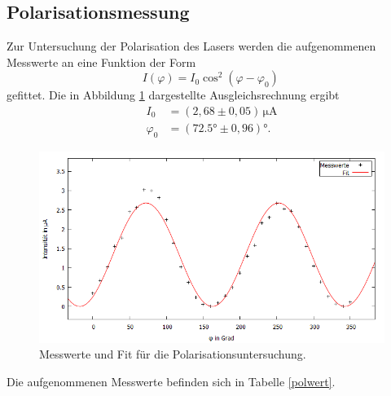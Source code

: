 \subsection{Polarisationsmessung}
Zur Untersuchung der Polarisation des Lasers werden die aufgenommenen Messwerte an eine Funktion der Form
\begin{equation}
   I(\varphi) = I_0 \cos^2\!\left(\varphi-\varphi_0\right)\,
\end{equation}
gefittet. Die in Abbildung \ref{polfit} dargestellte Ausgleichsrechnung ergibt
\begin{align*}
 I_0 &=(2,68 \pm 0,05)\, \si{\micro\ampere}\\
 \varphi_0 &= (72.5° \pm 0,96)°.
\end{align*}
\begin{figure}[H]
  \centering
  \includegraphics[width=14cm]{bilder/polarplot.png}
  \caption{Messwerte und Fit für die Polarisationsuntersuchung.}
  \label{polfit}
\end{figure}
Die aufgenommenen Messwerte befinden sich in Tabelle \ref{polwert}.
